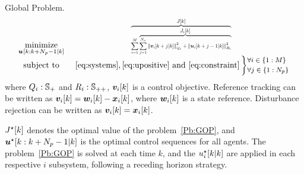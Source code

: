 \documentclass{ifacconf}  %
\begin{document}
\begin{problem}{Global \mpc{} Problem.}\label{Pb:GOP}
\begin{equation*}
\begin{matrix}
\underset{\useq}{\mathrm{minimize}}&\resizebox{0.35\textwidth}{!}{$\overbrace{\sum\limits^{M}_{i=1} \overbrace{\sum_{j=1}^{\predhorz} \norm{\mpcvec{v}[i][k+j][k]}^{2}_{Q_i}+\norm{\mpcvec{u}[i][k+j-1][k]}^{2}_{R_i}}^{\textstyle{} \obji}}^{\textstyle{} \globobj}$}\\
\mathrm{subject~ to}&~\eqref{eq:systems},\eqref{eq:upositive}\ \mathrm{and}\ \eqref{eq:constraint}
\left\}\small
\begin{aligned}
  &\forall i\in \{1:\nsubsystems\}\\
  &\forall j\in \{1:\predhorz\}
\end{aligned}\right.

\end{matrix}
\end{equation*}
where ${Q_{i}:\mathbb{S}_{+}}$ and ${R_{i}:\mathbb{S}_{++}}$, $\vik$ is a control objective.
Reference tracking can be written as ${\vik=\wik-\xik}$, where $\wik$ is a state reference.
Disturbance rejection can be written as ${\vik=\xik}$.

$\optglobobj$ denotes the optimal value of the problem~\ref{Pb:GOP}, and ${\optuseq}$ is the optimal control sequences for all agents.
The problem~\ref{Pb:GOP} is solved at each time $k$, and the ${\optuikk}$ are applied in each respective $i$ subsystem, following a receding horizon strategy.
\end{problem}
\end{document}
